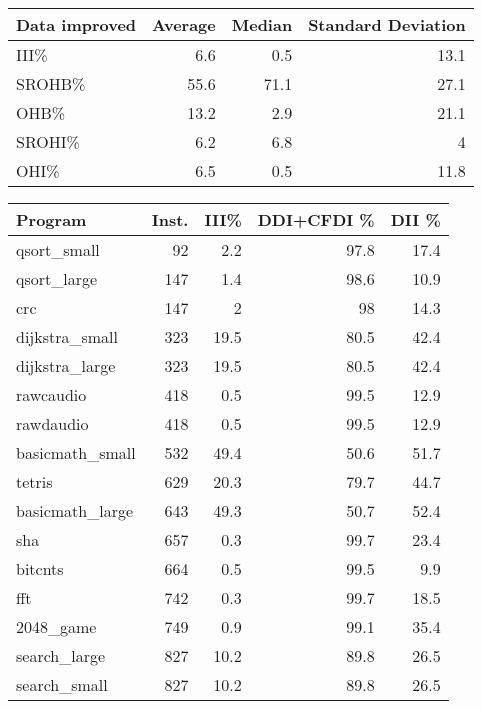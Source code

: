 \begin{tabular}{|l|r|r|r|}
\hline
 Data improved   &   Average &   Median &   Standard Deviation \\
\hline
 III\%            &       6.6 &      0.5 &                 13.1 \\
\hline
 SROHB\%          &      55.6 &     71.1 &                 27.1 \\
\hline
 OHB\%            &      13.2 &      2.9 &                 21.1 \\
\hline
 SROHI\%          &       6.2 &      6.8 &                  4   \\
\hline
 OHI\%            &       6.5 &      0.5 &                 11.8 \\
\hline
\end{tabular}
\begin{tabular}{lrrrr}
\hline
 Program         &   Inst. &   III\% &   DDI+CFDI \% &   DII \% \\
\hline
 qsort\_small     &      92 &    2.2 &         97.8 &    17.4 \\
 qsort\_large     &     147 &    1.4 &         98.6 &    10.9 \\
 crc             &     147 &    2   &         98   &    14.3 \\
 dijkstra\_small  &     323 &   19.5 &         80.5 &    42.4 \\
 dijkstra\_large  &     323 &   19.5 &         80.5 &    42.4 \\
 rawcaudio       &     418 &    0.5 &         99.5 &    12.9 \\
 rawdaudio       &     418 &    0.5 &         99.5 &    12.9 \\
 basicmath\_small &     532 &   49.4 &         50.6 &    51.7 \\
 tetris          &     629 &   20.3 &         79.7 &    44.7 \\
 basicmath\_large &     643 &   49.3 &         50.7 &    52.4 \\
 sha             &     657 &    0.3 &         99.7 &    23.4 \\
 bitcnts         &     664 &    0.5 &         99.5 &     9.9 \\
 fft             &     742 &    0.3 &         99.7 &    18.5 \\
 2048\_game       &     749 &    0.9 &         99.1 &    35.4 \\
 search\_large    &     827 &   10.2 &         89.8 &    26.5 \\
 search\_small    &     827 &   10.2 &         89.8 &    26.5 \\

\end{tabular}
